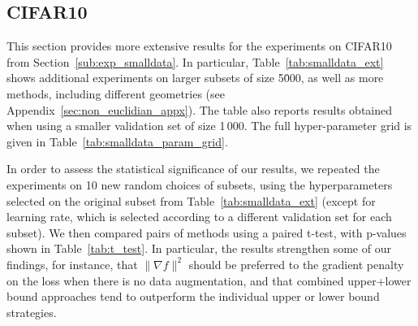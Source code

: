 
\subsection{CIFAR10}
\label{sub:cifar_appx}

This section provides more extensive results for the experiments on CIFAR10 from Section~\ref{sub:exp_smalldata}.
In particular, Table~\ref{tab:smalldata_ext} shows additional experiments on larger subsets of size 5\.000,
as well as more methods, including different geometries (see Appendix~\ref{sec:non_euclidian_appx}).
The table also reports results obtained when using a smaller validation set of size 1\,000.
The full hyper-parameter grid is given in Table~\ref{tab:smalldata_param_grid}.

In order to assess the statistical significance of our results,
we repeated the experiments on 10 new random choices of subsets, using the hyperparameters selected
on the original subset from Table~\ref{tab:smalldata_ext} (except for learning rate, which is selected according to a different validation set for each subset).
We then compared pairs of methods using a paired t-test, with p-values shown in Table~\ref{tab:t_test}.
In particular, the results strengthen some of our findings, for instance, that $\|\nabla f \|^2$
should be preferred to the gradient penalty on the loss when there is no data augmentation,
and that combined upper+lower bound approaches tend to outperform the individual upper or lower
bound strategies.


